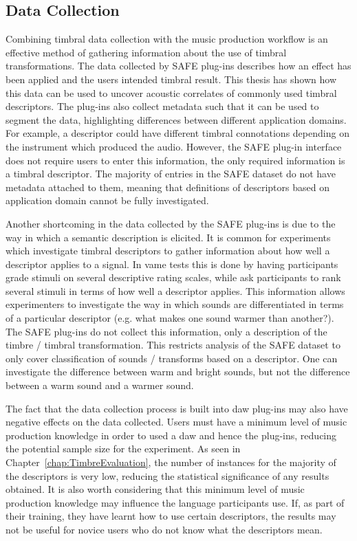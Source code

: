 	\subsection{Data Collection}
	\label{sec:Conclusion-Critique-DataCollection}
		Combining timbral data collection with the music production workflow is an effective method of gathering
		information about the use of timbral transformations. The data collected by SAFE plug-ins describes how an
		effect has been applied and the users intended timbral result. This thesis has shown how this data can be
		used to uncover acoustic correlates of commonly used timbral descriptors. The plug-ins also collect metadata
		such that it can be used to segment the data, highlighting differences between different application
		domains. For example, a descriptor could have different timbral connotations depending on the instrument
		which produced the audio. However, the SAFE plug-in interface does not require users to enter this
		information, the only required information is a timbral descriptor. The majority of entries in the SAFE
		dataset do not have metadata attached to them, meaning that definitions of descriptors based on application
		domain cannot be fully investigated. 

		Another shortcoming in the data collected by the SAFE plug-ins is due to the way in which a semantic
		description is elicited. It is common for experiments which investigate timbral descriptors to gather
		information about how well a descriptor applies to a signal. In \acrshort{vame} tests this is done by having
		participants grade stimuli on several descriptive rating scales, while \citet{cartwright2013socialeq} ask
		participants to rank several stimuli in terms of how well a descriptor applies. This information allows
		experimenters to investigate the way in which sounds are differentiated in terms of a particular descriptor
		(e.g. what makes one sound warmer than another?). The SAFE plug-ins do not collect this information, only a
		description of the timbre / timbral transformation. This restricts analysis of the SAFE dataset to only
		cover classification of sounds / transforms based on a descriptor. One can investigate the difference
		between warm and bright sounds, but not the difference between a warm sound and a warmer sound.

		The fact that the data collection process is built into \acrshort{daw} plug-ins may also have negative
		effects on the data collected. Users must have a minimum level of music production knowledge in order to
		used a \acrshort{daw} and hence the plug-ins, reducing the potential sample size for the experiment. As seen
		in Chapter~\ref{chap:TimbreEvaluation}, the number of instances for the majority of the descriptors is very
		low, reducing the statistical significance of any results obtained. It is also worth considering that this
		minimum level of music production knowledge may influence the language participants use. If, as part of
		their training, they have learnt how to use certain descriptors, the results may not be useful for novice
		users who do not know what the descriptors mean.

